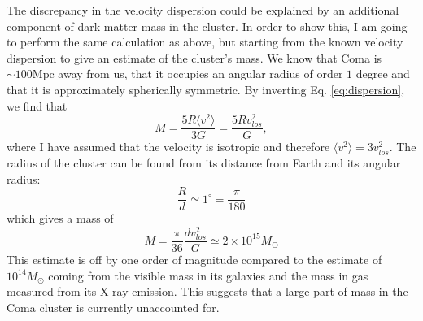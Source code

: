 The discrepancy in the velocity dispersion could be explained by an additional component of dark matter mass in the cluster. In order to show this, I am going to perform the same calculation as above, but starting from the known velocity dispersion to give an estimate of the cluster's mass. We know that Coma is \(\sim 100 \mathrm{Mpc} \) away from us, that it occupies an angular radius of order \(1\) degree and that it is approximately spherically symmetric. By inverting Eq. \eqref{eq:dispersion}, we find that
\begin{equation}
	M= \frac{5R \langle v^2 \rangle }{3G} = \frac{5R v_{los} ^2}{G},
\end{equation}
where I have assumed that the velocity is isotropic and therefore \(\langle v^2 \rangle = 3 v_{los} ^2\). The radius of the cluster can be found from its distance from Earth and its angular radius:
\begin{equation}
	\frac{R}{d} \simeq 1^{\circ} = \frac{\pi}{180}
\end{equation}
which gives a mass of
\begin{equation}
	M=\frac{\pi}{36} \frac{d v_{los} ^2}{G} \simeq 2 \times 10^{15} M_\odot
\end{equation}
This estimate is off by one order of magnitude compared to the estimate of \(10^{14} M_\odot\) coming from the visible mass in its galaxies and the mass in gas measured from its X-ray emission. This suggests that a large part of mass in the Coma cluster is currently unaccounted for.

